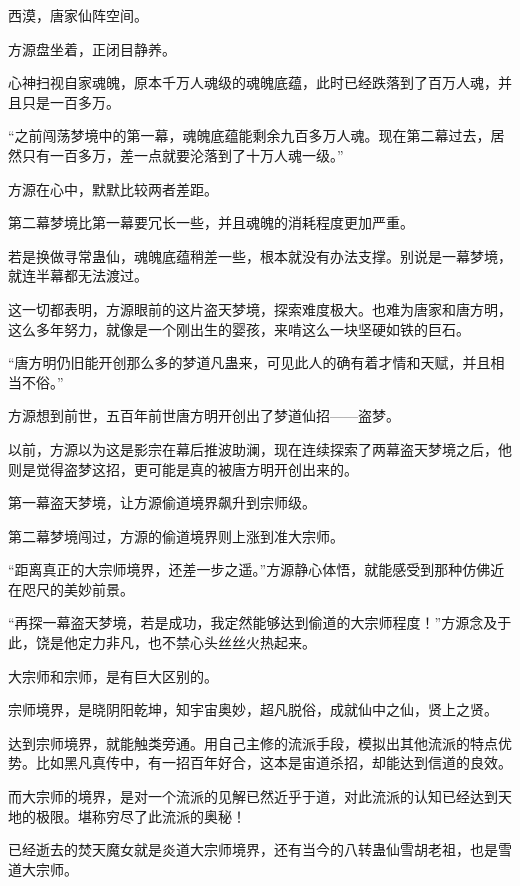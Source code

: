 
\begin{this_body}



西漠，唐家仙阵空间。

方源盘坐着，正闭目静养。

心神扫视自家魂魄，原本千万人魂级的魂魄底蕴，此时已经跌落到了百万人魂，并且只是一百多万。

“之前闯荡梦境中的第一幕，魂魄底蕴能剩余九百多万人魂。现在第二幕过去，居然只有一百多万，差一点就要沦落到了十万人魂一级。”

方源在心中，默默比较两者差距。

第二幕梦境比第一幕要冗长一些，并且魂魄的消耗程度更加严重。

若是换做寻常蛊仙，魂魄底蕴稍差一些，根本就没有办法支撑。别说是一幕梦境，就连半幕都无法渡过。

这一切都表明，方源眼前的这片盗天梦境，探索难度极大。也难为唐家和唐方明，这么多年努力，就像是一个刚出生的婴孩，来啃这么一块坚硬如铁的巨石。

“唐方明仍旧能开创那么多的梦道凡蛊来，可见此人的确有着才情和天赋，并且相当不俗。”

方源想到前世，五百年前世唐方明开创出了梦道仙招——盗梦。

以前，方源以为这是影宗在幕后推波助澜，现在连续探索了两幕盗天梦境之后，他则是觉得盗梦这招，更可能是真的被唐方明开创出来的。

第一幕盗天梦境，让方源偷道境界飙升到宗师级。

第二幕梦境闯过，方源的偷道境界则上涨到准大宗师。

“距离真正的大宗师境界，还差一步之遥。”方源静心体悟，就能感受到那种仿佛近在咫尺的美妙前景。

“再探一幕盗天梦境，若是成功，我定然能够达到偷道的大宗师程度！”方源念及于此，饶是他定力非凡，也不禁心头丝丝火热起来。

大宗师和宗师，是有巨大区别的。

宗师境界，是晓阴阳乾坤，知宇宙奥妙，超凡脱俗，成就仙中之仙，贤上之贤。

达到宗师境界，就能触类旁通。用自己主修的流派手段，模拟出其他流派的特点优势。比如黑凡真传中，有一招百年好合，这本是宙道杀招，却能达到信道的良效。

而大宗师的境界，是对一个流派的见解已然近乎于道，对此流派的认知已经达到天地的极限。堪称穷尽了此流派的奥秘！

已经逝去的焚天魔女就是炎道大宗师境界，还有当今的八转蛊仙雪胡老祖，也是雪道大宗师。


\end{this_body}
